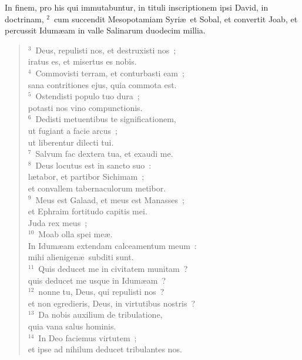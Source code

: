 \lettrine[lines=3,image=true,loversize=0.05,lraise=-0.03]{I}{}n finem, pro his qui immutabuntur, in tituli inscriptionem ipsi David, in doctrinam,
${}^{2}$~cum succendit Mesopotamiam Syri\ae\ et Sobal, et convertit Joab, et percussit Idum\ae am in valle Salinarum duodecim millia.
\begin{flushleft}\begin{verse}${}^{3}$~Deus, repulisti nos, et destruxisti nos~;\\ iratus es, et misertus es nobis.\\
${}^{4}$~Commovisti terram, et conturbasti eam~;\\ sana contritiones ejus, quia commota est.\\
${}^{5}$~Ostendisti populo tuo dura~;\\ potasti nos vino compunctionis.\\
${}^{6}$~Dedisti metuentibus te significationem,\\ ut fugiant a facie arcus~;\\ ut liberentur dilecti tui.\\
${}^{7}$~Salvum fac dextera tua, et exaudi me.\\
${}^{8}$~Deus locutus est in sancto suo~:\\ l\ae tabor, et partibor Sichimam~;\\ et convallem tabernaculorum metibor.\\
${}^{9}$~Meus est Galaad, et meus est Manasses~;\\ et Ephraim fortitudo capitis mei.\\ Juda rex meus~;\\
${}^{10}$~Moab olla spei me\ae .\\ In Idum\ae am extendam calceamentum meum~:\\ mihi alienigen\ae\ subditi sunt.\\
${}^{11}$~Quis deducet me in civitatem munitam~?\\ quis deducet me usque in Idum\ae am~?\\
${}^{12}$~nonne tu, Deus, qui repulisti nos~?\\ et non egredieris, Deus, in virtutibus nostris~?\\
${}^{13}$~Da nobis auxilium de tribulatione,\\ quia vana salus hominis.\\
${}^{14}$~In Deo faciemus virtutem~;\\ et ipse ad nihilum deducet tribulantes nos.\end{verse}\end{flushleft}



